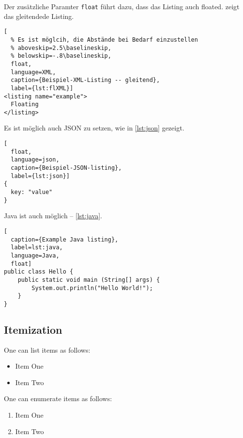 \documentclass[runningheads,a4paper,ngerman]{llncs}[2022/01/12]
\begin{document}
Der zusätzliche Paramter \verb+float+ führt dazu, dass das Listing auch floated.
 zeigt das gleitendede Listing.

\begin{ltgexample}
\begin{lstlisting}[
  % Es ist möglcih, die Abstände bei Bedarf einzustellen
  % aboveskip=2.5\baselineskip,
  % belowskip=-.8\baselineskip,
  float,
  language=XML,
  caption={Beispiel-XML-Listing -- gleitend},
  label={lst:flXML}]
<listing name="example">
  Floating
</listing>
\end{lstlisting}
\end{ltgexample}

Es ist möglich auch JSON zu setzen, wie in \cref{lst:json} gezeigt.

\begin{ltgexample}
\begin{lstlisting}[
  float,
  language=json,
  caption={Beispiel-JSON-listing},
  label={lst:json}]
{
  key: "value"
}
\end{lstlisting}
\end{ltgexample}

Java ist auch möglich -- \cref{lst:java}.

\begin{ltgexample}
\begin{lstlisting}[
  caption={Example Java listing},
  label=lst:java,
  language=Java,
  float]
public class Hello {
    public static void main (String[] args) {
        System.out.println("Hello World!");
    }
}
\end{lstlisting}
\end{ltgexample}

\subsection{Itemization}

One can list items as follows:

\begin{ltgexample}
\begin{itemize}
\item Item One
\item Item Two
\end{itemize}
\end{ltgexample}


One can enumerate items as follows:

\begin{ltgexample}
\begin{enumerate}
  \item Item One
  \item Item Two
\end{enumerate}
\end{ltgexample}
\end{document}
